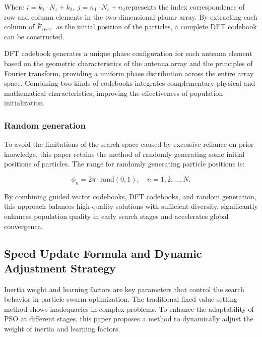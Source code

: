 \documentclass[lettersize,journal]{IEEEtran}
\begin{document}
Where \(i = k_{1} \cdot N_{z} + k_{2},\ j = n_{1} \cdot N_{z} + n_{2}\)represents the index correspondence of row and column elements in the two-dimensional planar array. By extracting each column of \({\bar{F}}_{\text{DFT~}}\) as the initial position of the particles, a complete DFT codebook can be constructed.


DFT codebook generates a unique phase configuration for each antenna element based on the geometric characteristics of the antenna array and the principles of Fourier transform, providing a uniform phase distribution across the entire array space. Combining two kinds of codebooks integrates complementary physical and mathematical characteristics, improving the effectiveness of population initialization.

\subsubsection{Random generation}\label{random-generation}

To avoid the limitations of the search space caused by excessive reliance on prior knowledge, this paper retains the method of randomly generating some initial positions of particles. The range for randomly generating particle positions is:

\begin{equation}
  \phi_{n} = 2\pi \cdot \text{rand}(0,1), \quad n=1,2,\ldots,N.
  \label{eq:random_initialization}
\end{equation}

By combining guided vector codebooks, DFT codebooks, and random generation, this approach balances high-quality solutions with sufficient diversity,  significantly enhances population quality in early search stages and accelerates global convergence.

\subsection{Speed Update Formula and Dynamic Adjustment
  Strategy}\label{b.-speed-update-formula-and-dynamic-adjustment-strategy}

Inertia weight and learning factors are key parameters that control the search behavior in particle swarm optimization. The traditional fixed value setting method shows inadequacies in complex problems. To enhance the adaptability of PSO at different stages, this paper proposes a method to dynamically adjust the weight of inertia and learning factors.
\end{document}
